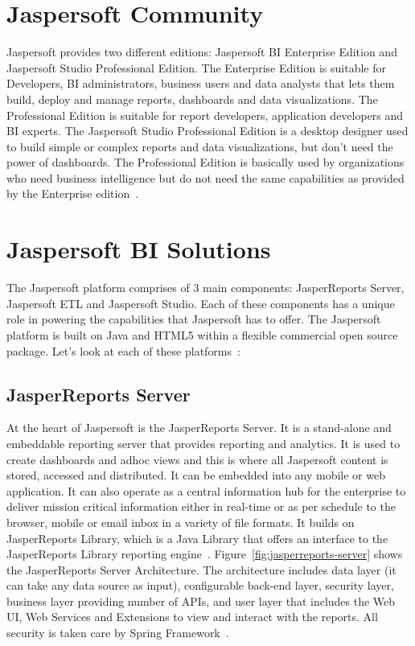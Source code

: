 \section{Jaspersoft Community}
Jaspersoft provides two different editions: Jaspersoft BI Enterprise Edition and
Jaspersoft Studio Professional Edition. The Enterprise Edition is suitable for
Developers, BI administrators, business users and data analysts that lets them
build, deploy and manage reports, dashboards and data visualizations. The
Professional Edition is suitable for report developers, application developers
and BI experts. The Jaspersoft Studio Professional Edition is a desktop designer
used to build simple or complex reports and data visualizations, but don't need
the power of dashboards. The Professional Edition is basically used by
organizations who need business intelligence but do not need the same
capabilities as provided by the Enterprise
edition~\cite{hid-sp18-516-www-jaspersoft-download}.  


\section{Jaspersoft BI Solutions}
The Jaspersoft platform comprises of 3 main components: JasperReports Server,
Jaspersoft ETL and Jaspersoft Studio. Each of these components has a unique role
in powering the capabilities that Jaspersoft has to offer. The Jaspersoft
platform is built on Java and HTML5 within a flexible commercial open source
package. Let's look at each of these
platforms~\cite{hid-sp18-516-www-jaspersoft-quick-start}:

\subsection{JasperReports Server}
At the heart of Jaspersoft is the JasperReports Server. It is a stand-alone and
embeddable reporting server that provides reporting and analytics. It is used to
create dashboards and adhoc views and this is where all Jaspersoft content is
stored, accessed and distributed. It can be embedded into any mobile or web
application. It can also operate as a central information hub for the enterprise
to deliver mission critical information either in real-time or as per schedule
to the browser, mobile or email inbox in a variety of file formats. It builds on
JasperReports Library, which is a Java Library that offers an interface to the
JasperReports Library reporting
engine~\cite{hid-sp18-516-www-jasperreports-server}.
Figure~\ref{fig:jasperreports-server} shows the JasperReports Server
Architecture. The architecture includes data layer (it can take any data source
as input), configurable back-end layer, security layer, business layer providing
number of APIs, and user layer that includes the Web UI, Web Services and
Extensions to view and interact with the reports. All security is taken care by
Spring Framework~\cite{hid-sp18-516-www-jasperreports-server-architecture}. 

